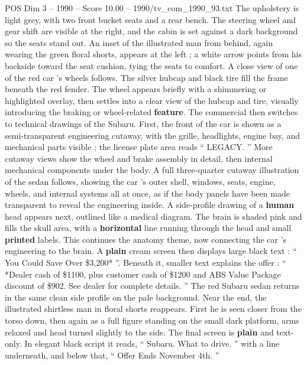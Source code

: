 \begin{textsample}{POS Dim 3 – 1990 – Score 10.00 – 1990/tv\_com\_1990\_93.txt}
The upholstery is light grey, with two front bucket seats and a rear bench.
The steering wheel and gear shift are visible at the right, and the cabin is set against a dark background so the seats stand out.
An inset of the illustrated man from behind, again wearing the green floral shorts, appears at the left ; a white arrow points from his backside toward the seat cushion, tying the seats to comfort.
A close view of one of the red car ’s wheels follows.
The silver hubcap and black tire fill the frame beneath the red fender.
The wheel appears briefly with a shimmering or highlighted overlay, then settles into a clear view of the hubcap and tire, visually introducing the braking or wheel-related \textbf{feature}.
The commercial then switches to technical drawings of the Subaru.
First, the front of the car is shown as a semi-transparent engineering cutaway, with the grille, headlights, engine bay, and mechanical parts visible ; the license plate area reads “ LEGACY. ” More cutaway views show the wheel and brake assembly in detail, then internal mechanical components under the body.
A full three-quarter cutaway illustration of the sedan follows, showing the car ’s outer shell, windows, seats, engine, wheels, and internal systems all at once, as if the body panels have been made transparent to reveal the engineering inside.
A side-profile drawing of a \textbf{human} head appears next, outlined like a medical diagram.
The brain is shaded pink and fills the skull area, with a \textbf{horizontal} line running through the head and small \textbf{printed} labels.
This continues the anatomy theme, now connecting the car ’s engineering to the brain.
A \textbf{plain} cream screen then displays large black text : “ You Could Save Over \$3,200* ”.
Beneath it, smaller text explains the offer : “ *Dealer cash of \$1100, plus customer cash of \$1200 and ABS Value Package discount of \$902.
See dealer for complete details. ” The red Subaru sedan returns in the same clean side profile on the pale background.
Near the end, the illustrated shirtless man in floral shorts reappears.
First he is seen closer from the torso down, then again as a full figure standing on the small dark platform, arms relaxed and head turned slightly to the side.
The final screen is \textbf{plain} and text-only.
In elegant black script it reads, “ Subaru.
What to drive. ” with a line underneath, and below that, “ Offer Ends November 4th. ”

\end{textsample}
